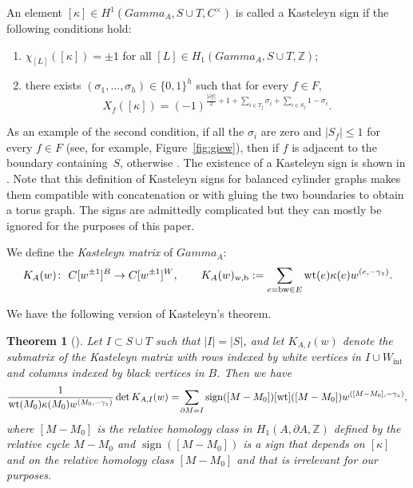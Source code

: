 \documentclass[10pt,a4paper]{amsart}
\numberwithin{equation}{section}
\newtheorem{Theorem}{Theorem}[section]
\newcommand{\Z}{{\mathbb Z}}
\newcommand{\C}{{\mathbb C}}
\newcommand{\A}{{\mathbb A}}
\newcommand{\ra}{\rightarrow}
\newcommand{\la}{\label}
\newcommand{\w}{{\rm w}}
\newcommand{\bw}{{\rm b}}
\newcommand{\wt}{{\rm wt}}
\def\A{A}
\def\Gamma{Gamma}
\def\C{C}
\begin{document}
	An element $[\kappa] \in H^1(\Gamma_\A,S \cup T,\C^\times)$ is called a Kasteleyn sign if the following conditions hold:
	\begin{enumerate}\itemsep=0pt
		\item[(1)] $\chi_{[L]}([\kappa])=\pm 1$ for all $[L] \in H_1(\Gamma_\A,S \cup T,\Z)$;
		\item[(2)] there exists $(\sigma_1,\dots,\sigma_h)\in\{0,1\}^h$ such that for every $f\in F$,
		\[
			X_f([\kappa])=(-1)^{\frac{|\partial f|}{2}+1+\sum\limits_{i\in T_f} \sigma_i + \sum\limits_{i\in S_f} 1-\sigma_i}.
		\]
	\end{enumerate}
	As an example of the second condition, if all the $\sigma_i$ are zero and $|S_f|\leq1$ for every $f\in F$ (see, for example, Figure~\ref{fig:giew}), then  if $f$ is adjacent to the boundary containing~$S$, otherwise .
	The existence of a Kasteleyn sign is shown in \cite[Proposition~2.1]{CR2}. Note that this definition of Kasteleyn signs for balanced cylinder graphs makes them compatible with concatenation or with gluing the two boundaries to obtain a torus graph. {The signs are admittedly complicated but they can mostly be ignored for the purposes of this paper.}
	
	We define the \emph{Kasteleyn matrix} of $\Gamma_\A$:
	\begin{align*}
		K_\A(w)\colon \ \C[w^{\pm 1}]^B \ra \C[w^{\pm 1}]^W, \qquad
		K_\A(w)_{{\rm w},{\rm b}} :=\sum_{e=\bw \w\in E} {\rm wt}(e) \kappa(e) w^{(e,-\gamma_z)}.
	\end{align*}
	
	We have the following version of Kasteleyn's theorem.
	\begin{Theorem}[]\la{thm:cimres}
		Let $I \subset S \cup T$ such that $|I|=|S|$, and let $K_{\A,I}(w)$ denote the submatrix of the Kasteleyn matrix with rows indexed by white vertices in $I \cup W_{\text{int}}$ and columns indexed by black vertices in $B$. Then we have
		\begin{gather*}
		\frac{1}{\wt(M_0) \kappa(M_0)w^{(M_0,-\gamma_z)}}\det K_{\A,I}(w)=\!\sum_{\partial M=I} \operatorname{sign}([M-M_0]) [\wt]([M-M_0]) w^{([M-M_0],-\gamma_z)},
		\end{gather*}
		where $[M-M_0]$ is the relative homology class in $H_1(\A, \partial \A,\Z)$ defined by the relative cycle $M-M_0$ and $\operatorname{sign}([M-M_0])$ is a sign that depends on $[\kappa]$ and on the relative homology class $[M-M_0]$ and that is irrelevant for our purposes.
	\end{Theorem}
	
\end{document}
